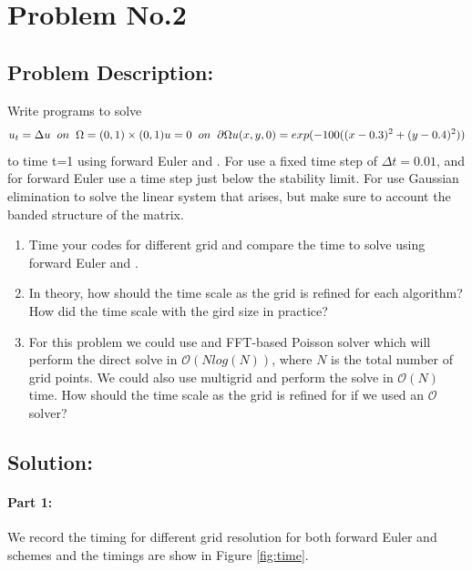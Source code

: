 \section{Problem No.2} \label{sec:prob2}
\subsection{Problem Description:} 
Write programs to solve 
$$
u_{t} = \Delta u \;\; on \;\; \Omega = (0,1) \times (0,1)\\
u=0 \;\; on \;\; \partial \Omega \\
u(x,y,0) = exp(-100((x-0.3)^{2} + (y-0.4)^{2}))
$$
to time t=1 using forward Euler and \cn. For \protect{\cn} use a fixed time step of $\Delta t =0.01$, and for forward Euler use a time step just below the stability limit. For \protect{\cn} use Gaussian elimination to solve the linear system that arises, but make sure to account the banded structure of the matrix.
\begin{enumerate}
\item Time your codes for different grid and compare the time to solve using forward Euler and \cn. 
\item In theory, how should the time scale as the grid is refined for each algorithm? How did the time scale with the gird size in practice?
\item For this problem we could use and FFT-based Poisson solver which will perform the direct solve in $\mathcal{O}(Nlog(N))$, where $N$ is the total number of grid points. We could also use multigrid and perform the solve in $\mathcal{O}(N)$ time. How should the time scale as the grid is refined for \protect{\cn} if we used an $\mathcal{O}$ solver? 
\end{enumerate}

\subsection{Solution:}
\paragraph{Part 1:} We record the timing for different grid resolution for both forward Euler and \protect{\cn} schemes and the timings are show in Figure \ref{fig:time}. 


